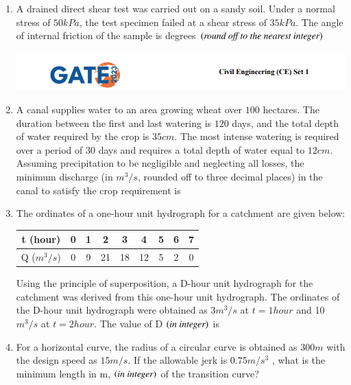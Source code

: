 \documentclass[journal,14pt,onecolumn]{IEEEtran}
\theoremstyle{remark}
\begin{document}
\begin{enumerate}[label={Q\arabic*.}]
\item A drained direct shear test was carried out on a sandy soil. Under a normal stress of $50kPa$, the test specimen failed at a shear stress of $35kPa$. The angle of internal friction of the sample is \underline{\hspace{2cm}} degrees $\left(\textit{round off to the nearest integer}\right)$

\newpage

\includegraphics[width=\textwidth]{pics/header.png}
\item A canal supplies water to an area growing wheat over $100$ hectares. The duration between the first and last watering is $120$ days, and the total depth of water required by the crop is $35 cm$. The most intense watering is required over a period of $30$ days and requires a total depth of water equal to $12 cm$. Assuming precipitation to be negligible and neglecting all losses, the minimum discharge (in $m^3/s$, rounded off to three decimal places) in the canal to satisfy the crop requirement is \underline{\hspace{3cm}}
\vspace{1cm}

\item The ordinates of a one-hour unit hydrograph for a catchment are given below:\\
\vspace{0.25cm}
\begin{table}[h!]
    \centering
    \begin{tabular}{|c|c|c|c|c|c|c|c|c|}
    \hline
    t (hour) & 0 & 1 & 2 & 3 & 4 & 5 & 6 & 7\\
    \hline
    Q ($m^3/s$) & 0 & 9 & 21 & 18 & 12 & 5 & 2 & 0\\
    \hline
    \end{tabular}
\end{table}
Using the principle of superposition, a D-hour unit hydrograph for the catchment was derived from this one-hour unit hydrograph. The ordinates of the D-hour unit hydrograph were obtained as $3 m^3/s$ at $t = 1 hour$ and 10 $m^3/s$ at $t = 2 hour$. The value of D $\left(\textit{in integer}\right)$ is \underline{\hspace{3cm}}
\vspace{1cm}

\item For a horizontal curve, the radius of a circular curve is obtained as $300 m$ with the design speed as $15 m/s$. If the allowable jerk is $0.75 m/s^3$ , what is the minimum length in m, $\left(\textit{in integer}\right)$ of the transition curve? \underline{\hspace{3cm}}


\end{enumerate}
\end{document}
